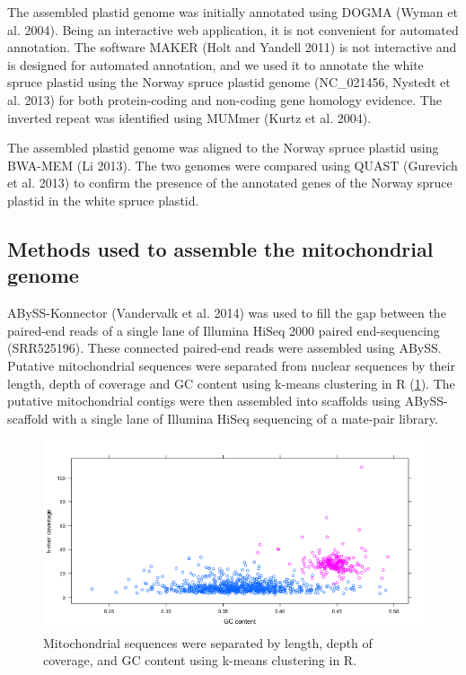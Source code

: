 \documentclass[
  12pt,
  oneside,
  openany]{book}
\begin{document}
The assembled plastid genome was initially annotated using DOGMA (Wyman et al. 2004). Being an interactive web application, it is not convenient for automated annotation. The software MAKER (Holt and Yandell 2011) is not interactive and is designed for automated annotation, and we used it to annotate the white spruce plastid using the Norway spruce plastid genome (NC\_021456, Nystedt et al. 2013) for both protein-coding and non-coding gene homology evidence. The inverted repeat was identified using MUMmer (Kurtz et al. 2004).

The assembled plastid genome was aligned to the Norway spruce plastid using BWA-MEM (Li 2013). The two genomes were compared using QUAST (Gurevich et al. 2013) to confirm the presence of the annotated genes of the Norway spruce plastid in the white spruce plastid.

\hypertarget{methods-used-to-assemble-the-mitochondrial-genome}{%
\subsection{Methods used to assemble the mitochondrial genome}\label{methods-used-to-assemble-the-mitochondrial-genome}}

ABySS-Konnector (Vandervalk et al. 2014) was used to fill the gap between the paired-end reads of a single lane of Illumina HiSeq 2000 paired end-sequencing (SRR525196). These connected paired-end reads were assembled using ABySS. Putative mitochondrial sequences were separated from nuclear sequences by their length, depth of coverage and GC content using k-means clustering in R (\cref{fig:whitespruce-classifymt}). The putative mitochondrial contigs were then assembled into scaffolds using ABySS-scaffold with a single lane of Illumina HiSeq sequencing of a mate-pair library.

\begin{figure}
\hypertarget{fig:whitespruce-classifymt}{%
\centering
\includegraphics[width=5in,height=\textheight]{whitespruce/mt-classify.png}
\caption[Mitochondrial sequences were separated by length, depth of coverage, and GC content using k-means clustering in R.]{Mitochondrial sequences were separated by length, depth of coverage, and GC content using k-means clustering in R.}\label{fig:whitespruce-classifymt}
}
\end{figure}
\end{document}
